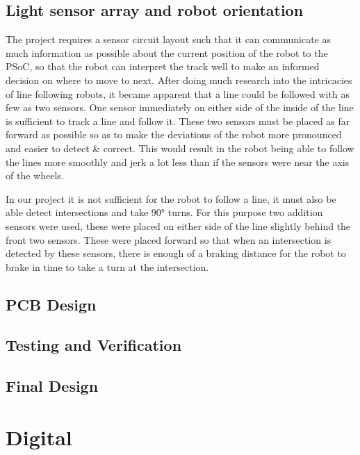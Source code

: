 \documentclass{article}
\begin{document}
\subsection{Light sensor array and robot orientation}

The project requires a sensor circuit layout such that it can communicate as much information as possible about the current position of the robot to the PSoC, so that the robot can interpret the track well to make an informed decision on where to move to next. After doing much research into the intricacies of line following robots, it became apparent that a line could be followed with as few as two sensors. One sensor immediately on either side of the inside of the line is sufficient to track a line and follow it. These two sensors must be placed as far forward as possible so as to make the deviations of the robot more pronounced and easier to detect \& correct. This would result in the robot being able to follow the lines more smoothly and jerk a lot less than if the sensors were near the axis of the wheels.

In our project it is not sufficient for the robot to follow a line, it must also be able detect intersections and take 90° turns. For this purpose two addition sensors were used, these were placed on either side of the line slightly behind the front two sensors. These were placed forward so that when an intersection is detected by these sensors, there is enough of a braking distance for the robot to brake in time to take a turn at the intersection.

\subsection{PCB Design}

\subsection{Testing and Verification}

\subsection{Final Design}


\section{Digital}
\end{document}
